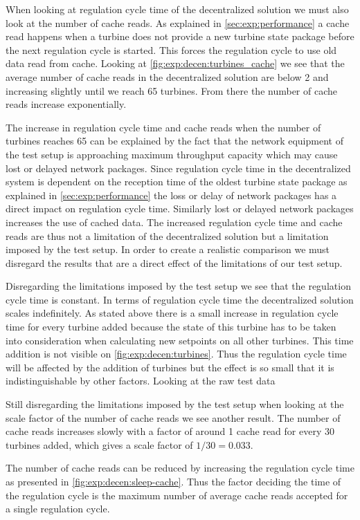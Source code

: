 When looking at regulation cycle time of the decentralized solution we must also look at the number of cache reads.
As explained in \cref{sec:exp:performance} a cache read happens when a turbine does not provide a new turbine state package before the next regulation cycle is started.
This forces the regulation cycle to use old data read from cache.
Looking at \cref{fig:exp:decen:turbines_cache} we see that the average number of cache reads in the decentralized solution are below 2 and increasing slightly until we reach 65 turbines. From there the number of cache reads increase exponentially.

The increase in regulation cycle time and cache reads when the number of turbines reaches 65 can be explained by the fact that the network equipment of the test setup is approaching maximum throughput capacity which may cause lost or delayed network packages.
Since regulation cycle time in the decentralized system is dependent on the reception time of the oldest turbine state package as explained in \cref{sec:exp:performance} the loss or delay of network packages has a direct impact on regulation cycle time.
Similarly lost or delayed network packages increases the use of cached data. The increased regulation cycle time and cache reads are thus not a limitation of the decentralized solution but a limitation imposed by the test setup. In order to create a realistic comparison we must disregard the results that are a direct effect of the limitations of our test setup.

Disregarding the limitations imposed by the test setup we see that the regulation cycle time is constant. In terms of regulation cycle time the decentralized solution scales indefinitely. As stated above there is a small increase in regulation cycle time for every turbine added because the state of this turbine has to be taken into consideration when calculating new setpoints on all other turbines. This time addition is not visible on \cref{fig:exp:decen:turbines}. Thus the regulation cycle time will be affected by the addition of turbines but the effect is so small that it is indistinguishable by other factors. Looking at the raw test data 

Still disregarding the limitations imposed by the test setup when looking at the scale factor of the number of cache reads we see another result. The number of cache reads increases slowly with a factor of around 1 cache read for every 30 turbines added, which gives a scale factor of $1 / 30 = 0.033$.

The number of cache reads can be reduced by increasing the regulation cycle time as presented in \cref{fig:exp:decen:sleep-cache}.
Thus the factor deciding the time of the regulation cycle is the maximum number of average cache reads accepted for a single regulation cycle.
